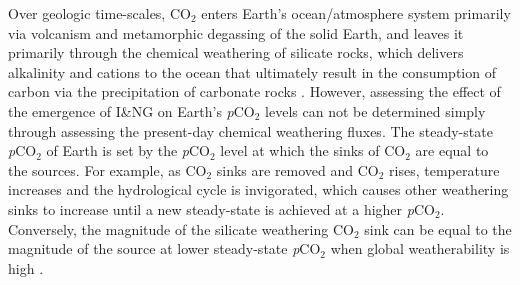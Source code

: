 \documentclass[11pt,letterpaper]{article}
\newcommand{\pCOtwo}{\textit{p}CO$_{2}$\xspace}
\newcommand{\COtwo}{CO$_{2}$\xspace}
\begin{document}

Over geologic time-scales, \COtwo enters Earth's ocean/atmosphere system primarily via volcanism and metamorphic degassing of the solid Earth, and leaves it primarily through the chemical weathering of silicate rocks, which delivers alkalinity and cations to the ocean that ultimately result in the consumption of carbon via the precipitation of carbonate rocks \citep{Kump2000a}. However, assessing the effect of the emergence of I\&NG on Earth's \pCOtwo levels can not be determined simply through assessing the present-day chemical weathering fluxes. The steady-state \pCOtwo of Earth is set by the \pCOtwo level at which the sinks of \COtwo are equal to the sources. For example, as \COtwo sinks are removed and \COtwo rises, temperature increases and the hydrological cycle is invigorated, which causes other weathering sinks to increase until a new steady-state is achieved at a higher \pCOtwo. Conversely, the magnitude of the silicate weathering \COtwo sink can be equal to the magnitude of the source at lower steady-state \pCOtwo when global weatherability is high \citep{Kump1997a}.
\end{document}
